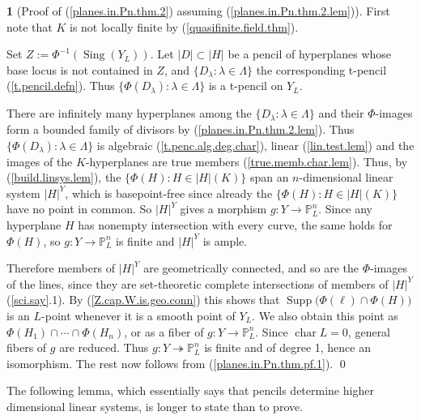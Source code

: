 \documentclass{amsart}
\theoremstyle{definition}
\newtheorem{say}[thm]{}
\theoremstyle{remark}
\newcommand{\p}[0]{{\mathbb P}}
\newcommand{\supp}[0]{\operatorname{Supp}}
\newcommand{\sing}[0]{\operatorname{Sing}}
\newcommand{\chr}[0]{\operatorname{char}}
\newcommand{\onto}[0]{\twoheadrightarrow}
\begin{document}
\begin{say}[Proof of (\ref{planes.in.Pn.thm.2}) assuming (\ref{planes.in.Pn.thm.2.lem})]
First note that $K$ is not locally finite  by (\ref{quasifinite.field.thm}).

Set $Z:=\Phi^{-1}(\sing(Y_L))$.  Let $|D|\subset |H|$ 
be a pencil of hyperplanes 
whose base locus is not contained in $Z$,
and
$\{D_{\lambda}: \lambda\in \Lambda\}$ the corresponding t-pencil (\ref{t.pencil.defn}).
Thus $\{\Phi(D_{\lambda}): \lambda\in \Lambda\}$ is a t-pencil on $Y_L$.

There are infinitely many hyperplanes among the $\{D_{\lambda}: \lambda\in \Lambda\}$ and their $\Phi$-images form a bounded family of divisors
by  (\ref{planes.in.Pn.thm.2.lem}). 
Thus   $\{\Phi(D_{\lambda}): \lambda\in \Lambda\}$ is
algebraic (\ref{t.penc.alg.deg.char}), linear (\ref{lin.test.lem})  and
the images of the $K$-hyperplanes are true members (\ref{true.memb.char.lem}).
Thus, by (\ref{build.linsys.lem}),  the $\{\Phi(H): H\in |H|(K)\}$ span an $n$-dimensional  linear system 
 $|H|^Y$, which is  basepoint-free
since already the $\{\Phi(H): H\in |H|(K)\}$ have no point in common.
So $|H|^Y$ gives a morphism  $g:Y\to \p^n_L$. 
Since any hyperplane $H$ has nonempty intersection with every curve, the same holds for $\Phi(H)$, so $g:Y\to \p^n_L$ is finite and  $|H|^Y$ is ample. 

Therefore  members of $|H|^Y$ are geometrically connected, and so are the $\Phi$-images of the lines, since they are set-theoretic complete intersections of members of  $|H|^Y$  (\ref{sci.say}.1).
By (\ref{Z.cap.W.is.geo.conn}) 
this shows that 
$\supp(\Phi(\ell)\cap \Phi(H)\bigr)$ is an $L$-point whenever
 it is a smooth point of $Y_L$. 
We also obtain this point as 
$\Phi(H_1)\cap\cdots\cap  \Phi(H_n)$, or as a fiber of
$g:Y\to \p^n_L$. Since $\chr L=0$, general fibers of $g$ are reduced.
 Thus   $g:Y\onto \p^n_L$ is finite and of degree 1, hence an isomorphism.  The rest now follows from (\ref{planes.in.Pn.thm.pf.1}).
\qed
\end{say}

The following lemma, which essentially says that pencils determine higher dimensional linear systems,  is longer to state than to prove.
\end{document}
